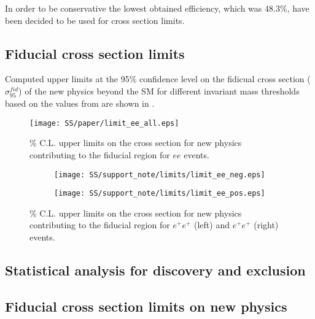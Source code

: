 In order to be conservative the lowest obtained efficiency, which was 48.3$\%$, have been decided to be used for cross section limits.


\subsection{Fiducial cross section limits}

Computed upper limits at the 95$\%$ confidence level on the fidicual cross section ($\sigma_{95}^{fid}$)
of the new physics beyond the SM for different invariant mass thresholds based on the values from 
are shown in . 

\begin{figure}[h]
\begin{center}
\texttt{[image: SS/paper/limit\_ee\_all.eps]}
\caption{\% C.L. upper limits on the cross section for new physics contributing to the fiducial region for $ee$ events.}
\label{fig:inclusive_fid_limit}
\end{center}
\end{figure}


\begin{figure}
\begin{subfigure}{.5\textwidth}
  \centering
  \texttt{[image: SS/support\_note/limits/limit\_ee\_neg.eps]}
\end{subfigure}%
\begin{subfigure}{.5\textwidth}
  \centering
  \texttt{[image: SS/support\_note/limits/limit\_ee\_pos.eps]}
\end{subfigure}
\caption{\% C.L. upper limits on the cross section for new physics contributing to the fiducial region 
for $e^{+}e^{+}$ (left) and $e^{+}e^{+}$ (right) events.}
  \label{fig:signal_kinematics}
\end{figure}

\subsection{Statistical analysis for discovery and exclusion}
\subsection{Fiducial cross section limits on new physics}

